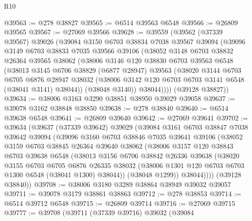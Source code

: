 \begin{lexlean}{R10}
\begin{coremodule}
@39563 := @278 @38827
@39565 := @6514 @39563 @6548
@39566 := @26809 @39565
@39567 := @27069 @39566
@39628 := @39559
    (@39562
      (@37339 @39567)
      @39026
      (@39084
        @3150
        @6703
        @38834
        @7038
        @39567
        @39094
        (@39096
          @3149
          @6703
          @38833
          @7035
          @39566
          @39106
          (@38052
            @3148
            @6703
            @38832
            @26364
            @39565
            @38062
            (@38006
              @3146
              @120
              @38830
              @6703
              @39563
              @6548
              (@38013
                @3145
                @6706
                @38829
                (@6877 @28947)
                @39563
                (@38020
                  @3144
                  @6703
                  @6705
                  @6876
                  @28947
                  @38032
                  (@38006 @3142 @120 @6703 @6703 @3141 @6548 (@38041 @3141) @38044))
                (@38048 @3140))
              @38044))))
      (@39128 @38827))
@39634 := @38006 @3163 @3290 @38851 @38950 @39029 @39058
@39637 := @39078 @3162 @38848 @38850
@39638 := @278 @38840
@39640 := @6514 @39638 @6548
@39641 := @26809 @39640
@39642 := @27069 @39641
@39702 := @39634
    (@39637
      (@37339 @39642)
      @39029
      (@39084
        @3161
        @6703
        @38847
        @7038
        @39642
        @39094
        (@39096
          @3160
          @6703
          @38846
          @7035
          @39641
          @39106
          (@38052
            @3159
            @6703
            @38845
            @26364
            @39640
            @38062
            (@38006
              @3157
              @120
              @38843
              @6703
              @39638
              @6548
              (@38013
                @3156
                @6706
                @38842
                @26336
                @39638
                (@38020
                  @3155
                  @6703
                  @6705
                  @6876
                  @26335
                  @38032
                  (@38006 @1301 @120 @6703 @6703 @1300 @6548 (@38041 @1300) @38044))
                (@38048 @1299))
              @38044))))
      (@39128 @38840))
@39708 := @38006 @3180 @3289 @38864 @38949 @39032 @39057
@39711 := @39078 @3179 @38861 @38863
@39712 := @278 @38853
@39714 := @6514 @39712 @6548
@39715 := @26809 @39714
@39716 := @27069 @39715
@39777 := @39708
    (@39711
      (@37339 @39716)
      @39032
      (@39084

\end{coremodule}
\end{lexlean}
